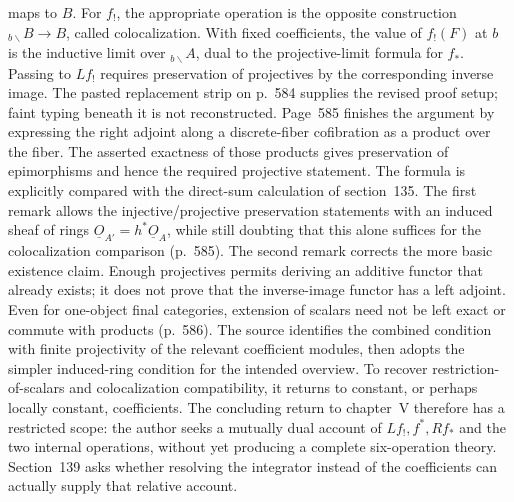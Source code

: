 \documentclass[10pt,oneside]{book}
\begin{document}
maps to $B$. For $f_!$, the appropriate operation is the opposite construction ${}_{b\backslash}B\to B$, called colocalization. With fixed coefficients, the value of $f_!(F)$ at $b$ is the inductive limit over ${}_{b\backslash}A$, dual to the projective-limit formula for $f_*$. Passing to $Lf_!$ requires preservation of projectives by the corresponding inverse image. The pasted replacement strip on p.~584 supplies the revised proof setup; faint typing beneath it is not reconstructed. Page~585 finishes the argument by expressing the right adjoint along a discrete-fiber cofibration as a product over the fiber. The asserted exactness of those products gives preservation of epimorphisms and hence the required projective statement. The formula is explicitly compared with the direct-sum calculation of section~135. The first remark allows the injective/projective preservation statements with an induced sheaf of rings $\underline O_{A'}=h^*\underline O_A$, while still doubting that this alone suffices for the colocalization comparison (p.~585). The second remark corrects the more basic existence claim. Enough projectives permits deriving an additive functor that already exists; it does not prove that the inverse-image functor has a left adjoint. Even for one-object final categories, extension of scalars need not be left exact or commute with products (p.~586). The source identifies the combined condition with finite projectivity of the relevant coefficient modules, then adopts the simpler induced-ring condition for the intended overview. To recover restriction-of-scalars and colocalization compatibility, it returns to constant, or perhaps locally constant, coefficients. The concluding return to chapter~V therefore has a restricted scope: the author seeks a mutually dual account of $Lf_!,f^*,Rf_*$ and the two internal operations, without yet producing a complete six-operation theory. Section~139 asks whether resolving the integrator instead of the coefficients can actually supply that relative account.
\end{document}
